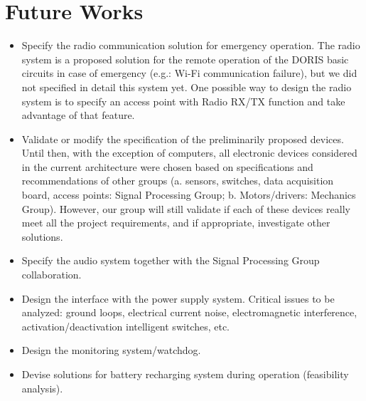 \section{Future Works}
\begin{itemize}
    \item Specify the radio communication solution for emergency operation. The radio system is a proposed solution for the remote operation of the DORIS basic circuits in case of emergency (e.g.: Wi-Fi communication failure), but we did not specified in detail this system yet. One possible way to design the radio system is to specify an access point with Radio RX/TX function and take advantage of that feature.
    \item Validate or modify the specification of the preliminarily proposed devices. Until then, with the exception of computers, all electronic devices considered in the current architecture were chosen based on specifications and recommendations of other groups (a. sensors, switches, data acquisition board, access points: Signal Processing Group; b. Motors/drivers: Mechanics Group). However, our group will still validate if each of these devices really meet all the project requirements, and if appropriate, investigate other solutions.
    \item Specify the audio system together with the Signal Processing Group collaboration.
    \item Design the interface with the power supply system. Critical issues to be analyzed: ground loops, electrical current noise, electromagnetic interference, activation/deactivation intelligent switches, etc.
    \item Design the monitoring system/watchdog.
    \item Devise solutions for battery recharging system during operation (feasibility analysis).
\end{itemize}

